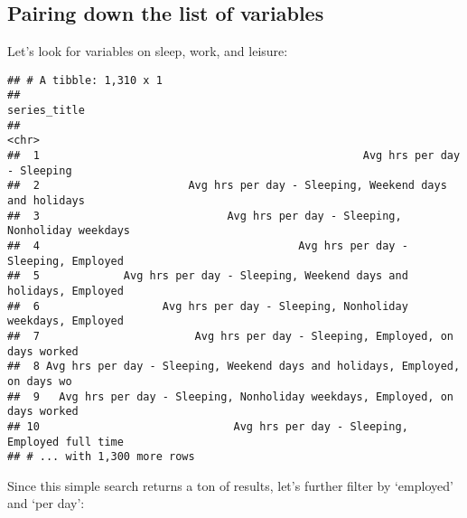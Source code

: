 \documentclass[]{book}
\newenvironment{Shaded}{\begin{snugshade}}{\end{snugshade}}
\newcommand{\KeywordTok}[1]{\textcolor[rgb]{0.13,0.29,0.53}{\textbf{{#1}}}}
\newcommand{\DataTypeTok}[1]{\textcolor[rgb]{0.13,0.29,0.53}{{#1}}}
\newcommand{\StringTok}[1]{\textcolor[rgb]{0.31,0.60,0.02}{{#1}}}
\newcommand{\OtherTok}[1]{\textcolor[rgb]{0.56,0.35,0.01}{{#1}}}
\newcommand{\NormalTok}[1]{{#1}}
\theoremstyle{definition}
\theoremstyle{definition}
\theoremstyle{remark}
\begin{document}
\subsection{Pairing down the list of
variables}\label{pairing-down-the-list-of-variables}

Let's look for variables on sleep, work, and leisure:

\begin{Shaded}
\end{Shaded}

\begin{verbatim}
## # A tibble: 1,310 x 1
##                                                                   series_title
##                                                                          <chr>
##  1                                                  Avg hrs per day - Sleeping
##  2                       Avg hrs per day - Sleeping, Weekend days and holidays
##  3                             Avg hrs per day - Sleeping, Nonholiday weekdays
##  4                                        Avg hrs per day - Sleeping, Employed
##  5             Avg hrs per day - Sleeping, Weekend days and holidays, Employed
##  6                   Avg hrs per day - Sleeping, Nonholiday weekdays, Employed
##  7                        Avg hrs per day - Sleeping, Employed, on days worked
##  8 Avg hrs per day - Sleeping, Weekend days and holidays, Employed, on days wo
##  9   Avg hrs per day - Sleeping, Nonholiday weekdays, Employed, on days worked
## 10                              Avg hrs per day - Sleeping, Employed full time
## # ... with 1,300 more rows
\end{verbatim}

Since this simple search returns a ton of results, let's further filter
by `employed' and `per day':

\begin{Shaded}
\end{Shaded}
\end{document}
